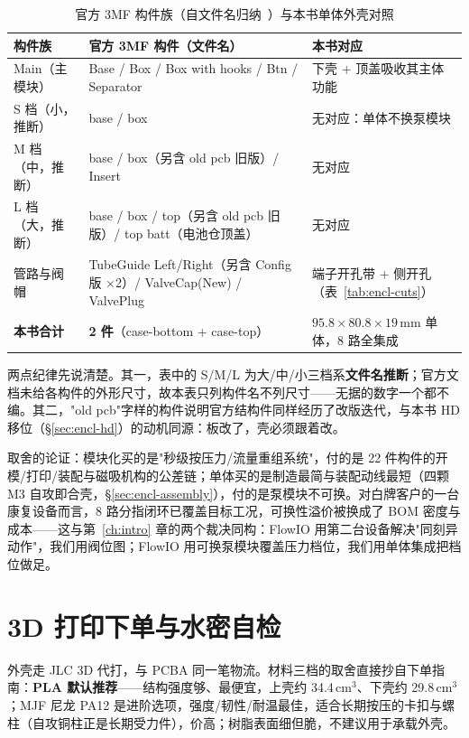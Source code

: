 \begin{table}[htbp]
  \centering
  \caption{官方 3MF 构件族（自文件名归纳~\cite{flowio-3mf-set}）与本书单体外壳对照}
  \label{tab:encl-3mf}
  \begin{tabular}{lp{5.4cm}p{3.8cm}}
    \toprule
    构件族 & 官方 3MF 构件（文件名） & 本书对应 \\
    \midrule
    Main（主模块） & Base / Box / Box with hooks / Btn / Separator & 下壳 + 顶盖吸收其主体功能 \\
    S 档（小，推断） & base / box & 无对应：单体不换泵模块 \\
    M 档（中，推断） & base / box（另含 old pcb 旧版）/ Insert & 无对应 \\
    L 档（大，推断） & base / box / top（另含 old pcb 旧版）/ top batt（电池仓顶盖） & 无对应 \\
    管路与阀帽 & TubeGuide Left/Right（另含 Config 版 $\times$2）/ ValveCap(New) / ValvePlug & 端子开孔带 + 侧开孔（表~\ref{tab:encl-cuts}） \\
    \midrule
    \textbf{本书合计} & \textbf{2 件}（case-bottom + case-top） & $95.8\times80.8\times19$\,mm 单体，8 路全集成 \\
    \bottomrule
  \end{tabular}
\end{table}

两点纪律先说清楚。其一，表中的 S/M/L 为大/中/小三档系\textbf{文件名推断}；官方文档未给各构件的外形尺寸，故本表只列构件名不列尺寸——无据的数字一个都不编。其二，"old pcb"字样的构件说明官方结构件同样经历了改版迭代，与本书 HD 移位（\S\ref{sec:encl-hd}）的动机同源：板改了，壳必须跟着改。

取舍的论证：模块化买的是"秒级按压力/流量重组系统"，付的是 22 件构件的开模/打印/装配与磁吸机构的公差链；单体买的是制造最简与装配动线最短（四颗 M3 自攻即合壳，\S\ref{sec:encl-assembly}），付的是泵模块不可换。对白牌客户的一台康复设备而言，8 路分指闭环已覆盖目标工况，可换性溢价被换成了 BOM 密度与成本——这与第~\ref{ch:intro} 章的两个裁决同构：FlowIO 用第二台设备解决"同刻异动作"，我们用阀位图；FlowIO 用可换泵模块覆盖压力档位，我们用单体集成把档位做足。

\section{3D 打印下单与水密自检}
\label{sec:encl-print}

外壳走 JLC 3D 代打，与 PCBA 同一笔物流。材料三档的取舍直接抄自下单指南：\textbf{PLA 默认推荐}——结构强度够、最便宜，上壳约 34.4\,cm$^3$、下壳约 29.8\,cm$^3$；MJF 尼龙 PA12 是进阶选项，强度/韧性/耐温最佳，适合长期按压的卡扣与螺柱（自攻铜柱正是长期受力件），价高；树脂表面细但脆，不建议用于承载外壳。

